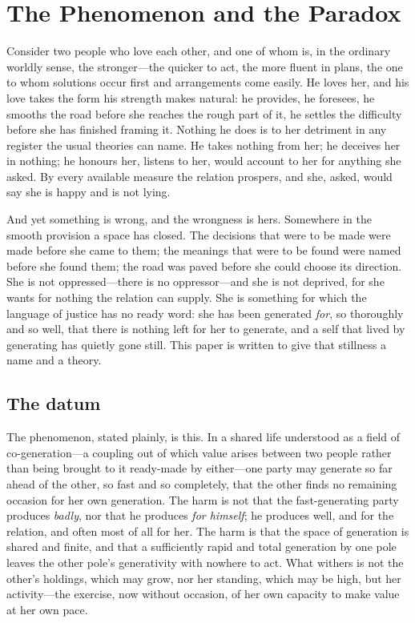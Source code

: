 \section{The Phenomenon and the Paradox}
\label{p18:sec:phenomenon}

\noindent
Consider two people who love each other, and one of whom is, in the ordinary worldly sense, the stronger---the quicker to act, the more fluent in plans, the one to whom solutions occur first and arrangements come easily. He loves her, and his love takes the form his strength makes natural: he provides, he foresees, he smooths the road before she reaches the rough part of it, he settles the difficulty before she has finished framing it. Nothing he does is to her detriment in any register the usual theories can name. He takes nothing from her; he deceives her in nothing; he honours her, listens to her, would account to her for anything she asked. By every available measure the relation prospers, and she, asked, would say she is happy and is not lying.

And yet something is wrong, and the wrongness is hers. Somewhere in the smooth provision a space has closed. The decisions that were to be made were made before she came to them; the meanings that were to be found were named before she found them; the road was paved before she could choose its direction. She is not oppressed---there is no oppressor---and she is not deprived, for she wants for nothing the relation can supply. She is something for which the language of justice has no ready word: she has been generated \emph{for}, so thoroughly and so well, that there is nothing left for her to generate, and a self that lived by generating has quietly gone still. This paper is written to give that stillness a name and a theory.

\subsection{The datum}
\label{p18:sub:phen-datum}

The phenomenon, stated plainly, is this. In a shared life understood as a field of co-generation---a coupling out of which value arises between two people rather than being brought to it ready-made by either---one party may generate so far ahead of the other, so fast and so completely, that the other finds no remaining occasion for her own generation. The harm is not that the fast-generating party produces \emph{badly}, nor that he produces \emph{for himself}; he produces well, and for the relation, and often most of all for her. The harm is that the space of generation is shared and finite, and that a sufficiently rapid and total generation by one pole leaves the other pole's generativity with nowhere to act. What withers is not the other's holdings, which may grow, nor her standing, which may be high, but her activity---the exercise, now without occasion, of her own capacity to make value at her own pace.

